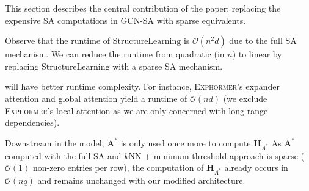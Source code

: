 This section describes the central contribution of the paper:
replacing the expensive SA computations in \textsc{GCN-SA}
with sparse equivalents.

Observe that the runtime of 
$ \text{StructureLearning}$ 
is $ \mathcal{O}(n^2d) $ due to the full SA mechanism.
We can reduce the runtime from quadratic (in $ n $)
to linear by replacing $ \text{StructureLearning} $
with a sparse SA mechanism.

 will have 
better runtime complexity.
For instance,
\textsc{Exphormer}'s
expander attention and global attention
yield a runtime of 
$\mathcal{O}(nd)$
(we exclude \textsc{Exphormer}'s local attention
as we are only concerned with long-range dependencies).

Downstream in the model, $ \mathbf{A}^* $
is only used once more to compute $ \mathbf{H}_{A^*} $
As $ \mathbf{A}^* $ computed with the full SA
and $ k $NN + minimum-threshold approach is sparse
($\mathcal{O}(1)$ non-zero entries per row),
the computation of $ \mathbf{H}_{A^*} $
already occurs in $ \mathcal{O}(nq) $
and remains unchanged with our modified architecture.
